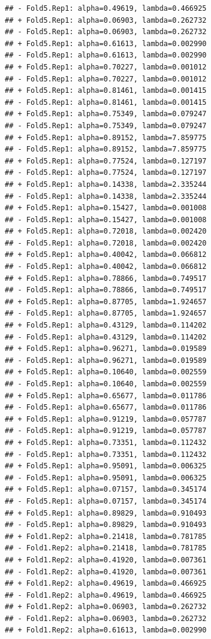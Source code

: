 \documentclass[
]{article}
\begin{document}
\begin{verbatim}
## - Fold5.Rep1: alpha=0.49619, lambda=0.466925 
## + Fold5.Rep1: alpha=0.06903, lambda=0.262732 
## - Fold5.Rep1: alpha=0.06903, lambda=0.262732 
## + Fold5.Rep1: alpha=0.61613, lambda=0.002990 
## - Fold5.Rep1: alpha=0.61613, lambda=0.002990 
## + Fold5.Rep1: alpha=0.70227, lambda=0.001012 
## - Fold5.Rep1: alpha=0.70227, lambda=0.001012 
## + Fold5.Rep1: alpha=0.81461, lambda=0.001415 
## - Fold5.Rep1: alpha=0.81461, lambda=0.001415 
## + Fold5.Rep1: alpha=0.75349, lambda=0.079247 
## - Fold5.Rep1: alpha=0.75349, lambda=0.079247 
## + Fold5.Rep1: alpha=0.89152, lambda=7.859775 
## - Fold5.Rep1: alpha=0.89152, lambda=7.859775 
## + Fold5.Rep1: alpha=0.77524, lambda=0.127197 
## - Fold5.Rep1: alpha=0.77524, lambda=0.127197 
## + Fold5.Rep1: alpha=0.14338, lambda=2.335244 
## - Fold5.Rep1: alpha=0.14338, lambda=2.335244 
## + Fold5.Rep1: alpha=0.15427, lambda=0.001008 
## - Fold5.Rep1: alpha=0.15427, lambda=0.001008 
## + Fold5.Rep1: alpha=0.72018, lambda=0.002420 
## - Fold5.Rep1: alpha=0.72018, lambda=0.002420 
## + Fold5.Rep1: alpha=0.40042, lambda=0.066812 
## - Fold5.Rep1: alpha=0.40042, lambda=0.066812 
## + Fold5.Rep1: alpha=0.78866, lambda=0.749517 
## - Fold5.Rep1: alpha=0.78866, lambda=0.749517 
## + Fold5.Rep1: alpha=0.87705, lambda=1.924657 
## - Fold5.Rep1: alpha=0.87705, lambda=1.924657 
## + Fold5.Rep1: alpha=0.43129, lambda=0.114202 
## - Fold5.Rep1: alpha=0.43129, lambda=0.114202 
## + Fold5.Rep1: alpha=0.96271, lambda=0.019589 
## - Fold5.Rep1: alpha=0.96271, lambda=0.019589 
## + Fold5.Rep1: alpha=0.10640, lambda=0.002559 
## - Fold5.Rep1: alpha=0.10640, lambda=0.002559 
## + Fold5.Rep1: alpha=0.65677, lambda=0.011786 
## - Fold5.Rep1: alpha=0.65677, lambda=0.011786 
## + Fold5.Rep1: alpha=0.91219, lambda=0.057787 
## - Fold5.Rep1: alpha=0.91219, lambda=0.057787 
## + Fold5.Rep1: alpha=0.73351, lambda=0.112432 
## - Fold5.Rep1: alpha=0.73351, lambda=0.112432 
## + Fold5.Rep1: alpha=0.95091, lambda=0.006325 
## - Fold5.Rep1: alpha=0.95091, lambda=0.006325 
## + Fold5.Rep1: alpha=0.07157, lambda=0.345174 
## - Fold5.Rep1: alpha=0.07157, lambda=0.345174 
## + Fold5.Rep1: alpha=0.89829, lambda=0.910493 
## - Fold5.Rep1: alpha=0.89829, lambda=0.910493 
## + Fold1.Rep2: alpha=0.21418, lambda=0.781785 
## - Fold1.Rep2: alpha=0.21418, lambda=0.781785 
## + Fold1.Rep2: alpha=0.41920, lambda=0.007361 
## - Fold1.Rep2: alpha=0.41920, lambda=0.007361 
## + Fold1.Rep2: alpha=0.49619, lambda=0.466925 
## - Fold1.Rep2: alpha=0.49619, lambda=0.466925 
## + Fold1.Rep2: alpha=0.06903, lambda=0.262732 
## - Fold1.Rep2: alpha=0.06903, lambda=0.262732 
## + Fold1.Rep2: alpha=0.61613, lambda=0.002990 

\end{verbatim}
\end{document}
